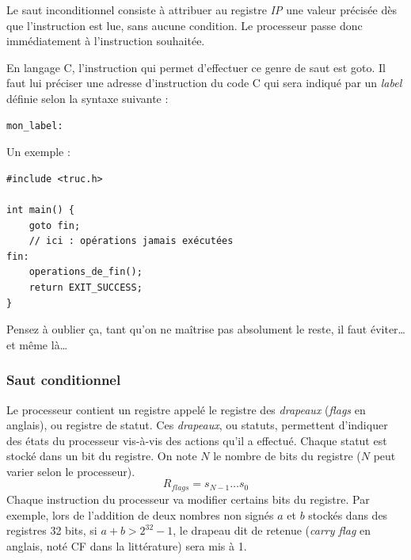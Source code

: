 \documentclass[../../../main.tex]{subfiles}
\begin{document}
Le saut inconditionnel consiste à attribuer au registre \textit{IP} une valeur précisée dès que l'instruction est lue, sans aucune condition. Le processeur passe donc immédiatement à l'instruction souhaitée.
 
En langage C, l'instruction qui permet d'effectuer ce genre de saut est \textsf{goto}. Il faut lui préciser une adresse d'instruction du code C qui sera indiqué par un \textit{label} définie selon la syntaxe suivante :
\begin{verbatim}
mon_label:
\end{verbatim}
Un exemple :
\begin{verbatim}
#include <truc.h>

int main() {
	goto fin;
	// ici : opérations jamais exécutées
fin:
	operations_de_fin();
	return EXIT_SUCCESS;
}
\end{verbatim}
Pensez à oublier ça, tant qu'on ne maîtrise pas absolument le reste, il faut éviter\dots et même là\dots
 
\subsubsection{Saut conditionnel}
 
Le processeur contient un registre appelé le registre des \textit{drapeaux} (\textit{flags} en anglais), ou registre de statut. Ces \textit{drapeaux}, ou statuts, permettent d'indiquer des états du processeur vis-à-vis des actions qu'il a effectué. Chaque statut est stocké dans un bit du registre. On note $N$ le nombre de bits du registre ($N$ peut varier selon le processeur).
$$R_{flags} = s_{N-1}\dots s_{0}$$
Chaque instruction du processeur va modifier certains bits du registre. Par exemple, lors de l'addition de deux nombres non signés $a$ et $b$ stockés dans des registres 32 bits, si $a + b > 2^{32} - 1$, le drapeau dit de retenue (\textit{carry flag} en anglais, noté CF dans la littérature) sera mis à 1.
 
\end{document}
